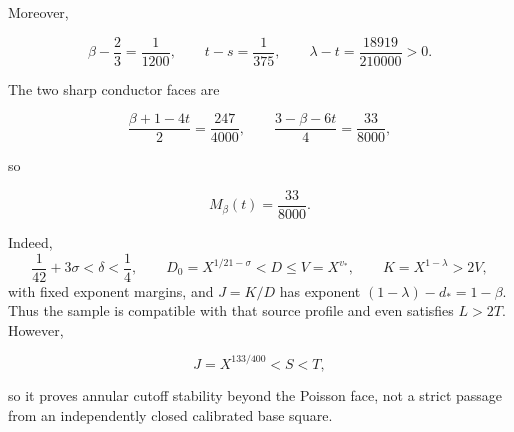 Moreover,

\begin{equation}
 \beta-\frac23=\frac1{1200},
 \qquad
 t-s=\frac1{375},
 \qquad
 \lambda-t=\frac{18919}{210000}>0.
 \label{eq:tpc26-high-sample-margins}
\end{equation}

The two sharp conductor faces are

\begin{equation}
 \frac{\beta+1-4t}{2}=\frac{247}{4000},
 \qquad
 \frac{3-\beta-6t}{4}=\frac{33}{8000},
 \label{eq:tpc26-high-sample-ledger}
\end{equation}

so

\begin{equation}
 \boxed{M_\beta(t)=\frac{33}{8000}.}
 \label{eq:tpc26-high-sample-saving}
\end{equation}

Indeed,
\[
 \frac1{42}+3\sigma<\delta<\frac14,\qquad
 D_0=X^{1/21-\sigma}<D\le V=X^{v_*},
 \qquad K=X^{1-\lambda}>2V,
\]
with fixed exponent margins, and \(J=K/D\) has exponent
\((1-\lambda)-d_*=1-\beta\).  Thus the sample is compatible with that
source profile and even satisfies \(L>2T\).  However,

\begin{equation}
 J=X^{133/400}<S<T,
 \label{eq:tpc26-high-sample-scope}
\end{equation}

so it proves annular cutoff stability beyond the Poisson face, not a
strict passage from an independently closed calibrated base square.
